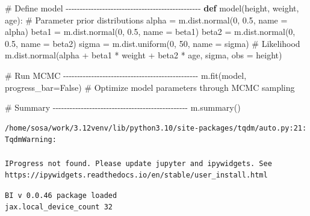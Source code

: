 \documentclass[
  letterpaper,
  DIV=11,
  numbers=noendperiod]{scrartcl}
\newenvironment{Shaded}{\begin{snugshade}}{\end{snugshade}}
\newcommand{\CommentTok}[1]{\textcolor[rgb]{0.37,0.37,0.37}{#1}}
\newcommand{\DecValTok}[1]{\textcolor[rgb]{0.68,0.00,0.00}{#1}}
\newcommand{\FloatTok}[1]{\textcolor[rgb]{0.68,0.00,0.00}{#1}}
\newcommand{\KeywordTok}[1]{\textcolor[rgb]{0.00,0.23,0.31}{\textbf{#1}}}
\newcommand{\NormalTok}[1]{\textcolor[rgb]{0.00,0.23,0.31}{#1}}
\newcommand{\OperatorTok}[1]{\textcolor[rgb]{0.37,0.37,0.37}{#1}}
\newcommand{\StringTok}[1]{\textcolor[rgb]{0.13,0.47,0.30}{#1}}
\newcommand{\VariableTok}[1]{\textcolor[rgb]{0.07,0.07,0.07}{#1}}
\begin{document}
\begin{Shaded}
\begin{Highlighting}[]
\CommentTok{\# Define model {-}{-}{-}{-}{-}{-}{-}{-}{-}{-}{-}{-}{-}{-}{-}{-}{-}{-}{-}{-}{-}{-}{-}{-}{-}{-}{-}{-}{-}{-}{-}{-}{-}{-}{-}{-}{-}{-}{-}{-}{-}{-}{-}{-}{-}{-}{-}{-}}
\KeywordTok{def}\NormalTok{ model(height, weight, age):}
    \CommentTok{\# Parameter prior distributions}
\NormalTok{    alpha }\OperatorTok{=}\NormalTok{ m.dist.normal(}\DecValTok{0}\NormalTok{, }\FloatTok{0.5}\NormalTok{, name }\OperatorTok{=} \StringTok{\textquotesingle{}alpha\textquotesingle{}}\NormalTok{)    }
\NormalTok{    beta1 }\OperatorTok{=}\NormalTok{ m.dist.normal(}\DecValTok{0}\NormalTok{, }\FloatTok{0.5}\NormalTok{, name }\OperatorTok{=} \StringTok{\textquotesingle{}beta1\textquotesingle{}}\NormalTok{)}
\NormalTok{    beta2 }\OperatorTok{=}\NormalTok{ m.dist.normal(}\DecValTok{0}\NormalTok{, }\FloatTok{0.5}\NormalTok{, name }\OperatorTok{=} \StringTok{\textquotesingle{}beta2\textquotesingle{}}\NormalTok{)}
\NormalTok{    sigma }\OperatorTok{=}\NormalTok{ m.dist.uniform(}\DecValTok{0}\NormalTok{, }\DecValTok{50}\NormalTok{, name }\OperatorTok{=} \StringTok{\textquotesingle{}sigma\textquotesingle{}}\NormalTok{)}
    \CommentTok{\# Likelihood}
\NormalTok{    m.dist.normal(alpha }\OperatorTok{+}\NormalTok{ beta1 }\OperatorTok{*}\NormalTok{ weight }\OperatorTok{+}\NormalTok{ beta2 }\OperatorTok{*}\NormalTok{ age, sigma, obs }\OperatorTok{=}\NormalTok{ height)}

\CommentTok{\# Run MCMC {-}{-}{-}{-}{-}{-}{-}{-}{-}{-}{-}{-}{-}{-}{-}{-}{-}{-}{-}{-}{-}{-}{-}{-}{-}{-}{-}{-}{-}{-}{-}{-}{-}{-}{-}{-}{-}{-}{-}{-}{-}{-}{-}{-}{-}{-}{-}{-}}
\NormalTok{m.fit(model, progress\_bar}\OperatorTok{=}\VariableTok{False}\NormalTok{) }\CommentTok{\# Optimize model parameters through MCMC sampling}

\CommentTok{\# Summary {-}{-}{-}{-}{-}{-}{-}{-}{-}{-}{-}{-}{-}{-}{-}{-}{-}{-}{-}{-}{-}{-}{-}{-}{-}{-}{-}{-}{-}{-}{-}{-}{-}{-}{-}{-}{-}{-}{-}{-}{-}{-}{-}{-}{-}{-}{-}{-}}
\NormalTok{m.summary()}
\end{Highlighting}
\end{Shaded}

\begin{verbatim}
/home/sosa/work/3.12venv/lib/python3.10/site-packages/tqdm/auto.py:21: TqdmWarning:

IProgress not found. Please update jupyter and ipywidgets. See https://ipywidgets.readthedocs.io/en/stable/user_install.html
\end{verbatim}

\begin{verbatim}
BI v 0.0.46 package loaded
jax.local_device_count 32
\end{verbatim}
\end{document}
